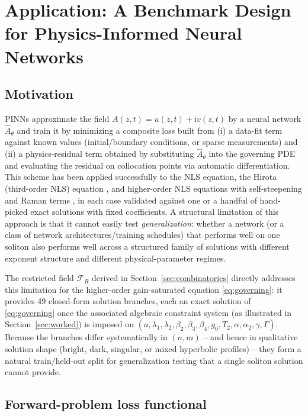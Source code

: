 \documentclass[11pt]{article}
\newcommand{\ii}{\mathrm{i}}
\begin{document}
\section{Application: A Benchmark Design for Physics-Informed Neural Networks}
\label{sec:pinn}

\subsection{Motivation}

PINNs \citep{raissi2019} approximate the field $A(z,t)=u(z,t)+\ii v(z,t)$ by a neural
network $\hat A_\theta$ and train it by minimizing a composite loss built from (i) a
data-fit term against known values (initial/boundary conditions, or sparse
measurements) and (ii) a physics-residual term obtained by substituting $\hat A_\theta$
into the governing PDE and evaluating the residual on collocation points via automatic
differentiation. This scheme has been applied successfully to the NLS equation, the
Hirota (third-order NLS) equation \citep{zhou2021}, and higher-order NLS equations with
self-steepening and Raman terms \citep{fang2021}, in each case validated against one or
a handful of hand-picked exact solutions with fixed coefficients. A structural
limitation of this approach is that it cannot easily test \emph{generalization}: whether
a network (or a class of network architectures/training schedules) that performs well on
one soliton also performs well across a structured family of solutions with different
exponent structure and different physical-parameter regimes.

The restricted field $\mathcal{F}_R$ derived in Section~\ref{sec:combinatorics}
directly addresses this limitation for the higher-order gain-saturated equation
\eqref{eq:governing}: it provides 49 closed-form solution branches, each an exact
solution of \eqref{eq:governing} once the associated algebraic constraint system (as
illustrated in Section~\ref{sec:worked}) is imposed on
$(a,\lambda_1,\lambda_2,\beta_2,\beta_3,\beta_4,g_0,T_2,\alpha,\alpha_2,\gamma,\Gamma)$.
Because the branches differ systematically in $(n,m)$ -- and hence in qualitative
solution shape (bright, dark, singular, or mixed hyperbolic profiles) -- they form a
natural train/held-out split for generalization testing that a single soliton solution
cannot provide.

\subsection{Forward-problem loss functional}
\end{document}
